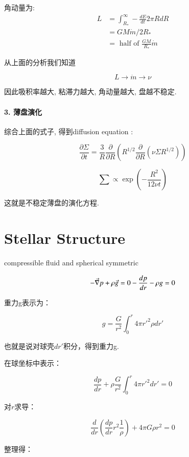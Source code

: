 \documentclass[fontset=windows]{report}
\begin{document}
角动量为:
\begin{equation}
  \begin{aligned}
    L &=\int_{R_{*}}^{\infty}-\frac{d E}{d t} 2 \pi R d R 
    \\&=G M \dot{m} / 2 R_{*} 
    \\&=\text { half of } \frac{G M}{R_{*}} \dot{m}
    \end{aligned}
\end{equation}


从上面的分析我们知道

\[L\longrightarrow \dot m \longrightarrow  \nu\]

因此吸积率越大, 粘滞力越大, 角动量越大, 盘越不稳定.

\hypertarget{3-ux8584ux76d8ux6f14ux5316}{%
\paragraph{3. 薄盘演化}\label{3-ux8584ux76d8ux6f14ux5316}}

综合上面的式子, 得到diffusion equation :

\[\frac{\partial \Sigma}{\partial t}=\frac{3}{R} \frac{\partial}{\partial R}\left(R^{1 / 2} \frac{\partial}{\partial R}\left(\nu \Sigma R^{1/2}\right)\right)\]

\[\sum \propto \exp \left(-\frac{R^{2}}{12 \nu t}\right)\]

这就是不稳定薄盘的演化方程.

\hypertarget{46-stellar-structure}{%
\section{Stellar Structure}\label{46-stellar-structure}}

compressible fluid and spherical symmetric

\[-\vec{\nabla}p+\rho \vec{g}=0\\
-\frac{dp}{dr}-\rho g = 0\]

重力g表示为：

\[g=\frac{G}{r^2}\int_{0}^{r}4\pi r'^2 \rho dr'\]

也就是说对球壳\(dr'\)积分，得到重力g.

在球坐标中表示：

\[\frac{dp}{dr}+\rho \frac{G}{r^2}\int_0^{r} 4\pi r'^2dr'=0\]

对\(r\)求导：

\[\frac{d}{dr} \left( \frac{dp}{dr}r^2\frac{1}{\rho} \right)+4\pi G\rho r^2=0\]

整理得：
\end{document}
